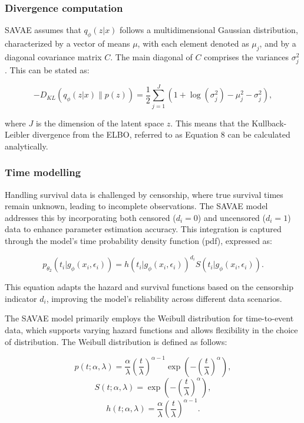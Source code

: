 \documentclass{article}
\begin{document}
\subsubsection{Divergence computation}

SAVAE assumes that \( q_\phi(z|x) \) follows a multidimensional Gaussian distribution, characterized by a vector of means \( \mu \), with each element denoted as \( \mu_j \), and by a diagonal covariance matrix \( C \). The main diagonal of \( C \) comprises the variances \( \sigma_j^2 \). This can be stated as:

\begin{equation}
-D_{KL}(q_\phi(z|x) \parallel p(z)) = \frac{1}{2} \sum_{j=1}^J \left(1 + \log(\sigma_j^2) - \mu_j^2 - \sigma_j^2\right),
\end{equation}

where \(J\) is the dimension of the latent space \(z\). This means that the Kullback-Leibler divergence from the ELBO, referred to as Equation 8 can be calculated analytically.

\subsubsection{Time modelling}
Handling survival data is challenged by censorship, where true survival times remain unknown, leading to incomplete observations. The SAVAE model addresses this by incorporating both censored (\(d_i=0\)) and uncensored (\(d_i=1\)) data to enhance parameter estimation accuracy. This integration is captured through the model's time probability density function (pdf), expressed as:

\begin{equation}
p_{\theta_2} (t_i|g_\phi(x_i, \epsilon_i)) = h(t_i|g_\phi(x_i, \epsilon_i))^{d_i} S(t_i|g_\phi(x_i, \epsilon_i)).
\end{equation}

This equation adapts the hazard and survival functions based on the censorship indicator \(d_i\), improving the model's reliability across different data scenarios.

The SAVAE model primarily employs the Weibull distribution for time-to-event data, which supports varying hazard functions and allows flexibility in the choice of distribution. The Weibull distribution is defined as follows:

\begin{equation}
p(t; \alpha, \lambda) = \frac{\alpha}{\lambda} \left(\frac{t}{\lambda}\right)^{\alpha-1} \exp\left(-\left(\frac{t}{\lambda}\right)^\alpha\right),
\end{equation}
\begin{equation}
S(t; \alpha, \lambda) = \exp\left(-\left(\frac{t}{\lambda}\right)^\alpha\right),
\end{equation}
\begin{equation}
h(t; \alpha, \lambda) = \frac{\alpha}{\lambda} \left(\frac{t}{\lambda}\right)^{\alpha-1}.
\end{equation}
\end{document}
